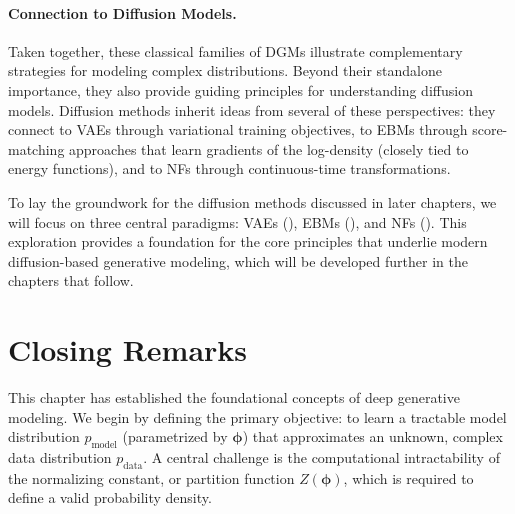 \paragraph{Connection to Diffusion Models.}
Taken together, these classical families of DGMs illustrate complementary strategies for modeling complex distributions.  
Beyond their standalone importance, they also provide guiding principles for understanding diffusion models.  
Diffusion methods inherit ideas from several of these perspectives: they connect to VAEs through variational training objectives, to EBMs through score-matching approaches that learn gradients of the log-density (closely tied to energy functions), and to NFs through continuous-time transformations.  

To lay the groundwork for the diffusion methods discussed in later chapters, we will focus on three central paradigms: VAEs (), EBMs (), and NFs ().  
This exploration provides a foundation for the core principles that underlie modern diffusion-based generative modeling, which will be developed further in the chapters that follow.





\newpage
\section{Closing Remarks}\label{sec:ch1_cr}


This chapter has established the foundational concepts of deep generative modeling. We begin by defining the primary objective: to learn a tractable model distribution $p_{\text{model}}$ (parametrized by $\bm{\phi}$) that approximates an unknown, complex data distribution $p_{\text{data}}$. A central challenge is the computational intractability of the normalizing constant, or partition function $Z(\bm{\phi})$, which is required to define a valid probability density.



